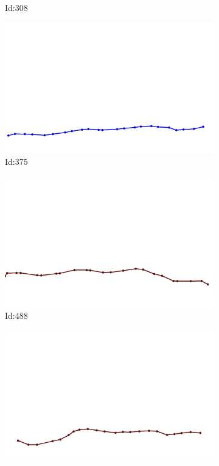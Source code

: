 \documentclass[12pt,twoside]{report}
\begin{document}
\begin{figure}
\begin{subfigure}[b]{0.20\textwidth}
\caption{Id:308}
\end{subfigure}
\begin{subfigure}[b]{0.20\textwidth}
\centering
\includegraphics[width=\textwidth]{../../trajectories/375.png}
\caption{Id:375}
\end{subfigure}
\begin{subfigure}[b]{0.20\textwidth}
\centering
\includegraphics[width=\textwidth]{../../trajectories/488.png}
\caption{Id:488}
\end{subfigure}
\begin{subfigure}[b]{0.20\textwidth}
\centering
\includegraphics[width=\textwidth]{../../trajectories/540.png}

\end{subfigure}
\end{figure}
\end{document}
